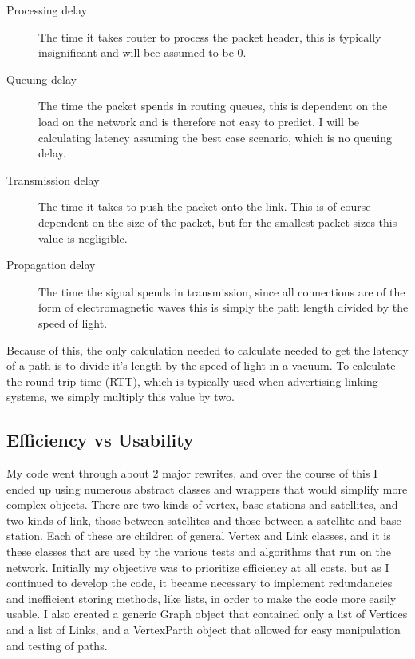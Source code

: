\documentclass[12pt]{report}
\begin{document}
\begin{description}
\item[Processing delay] The time it takes router to process the packet header, this is typically insignificant and will bee assumed to be 0.
\item[Queuing delay]  The time the packet spends in routing queues, this is dependent on the load on the network and is therefore not easy to predict. I will be calculating latency assuming the best case scenario, which is no queuing delay.
\item[Transmission delay] The time it takes to push the packet onto the link. This is of course dependent on the size of the packet, but for the smallest packet sizes this value is negligible. 
\item[Propagation delay] The time the signal spends in transmission, since all connections are of the form of electromagnetic waves this is simply the path length divided by the speed of light.
\end{description}

Because of this, the only calculation needed to calculate needed to get the latency of a path is to divide it's length by the speed of light in a vacuum. To calculate the round trip time (RTT), which is typically used when advertising linking systems, we simply multiply this value by two.

\subsection{Efficiency vs Usability}
My code went through about 2 major rewrites, and over the course of this I ended up using numerous abstract classes and wrappers that would simplify more complex objects. There are two kinds of vertex, base stations and satellites, and two kinds of link, those between satellites and those between a satellite and base station. Each of these are children of general Vertex and Link classes, and it is these classes that are used by the various tests and algorithms that run on the network. Initially my objective was to prioritize efficiency at all costs, but as I continued to develop the code, it became necessary to implement redundancies and inefficient storing methods, like lists, in order to make the code more easily usable. I also created a generic Graph object that contained only a list of Vertices and a list of Links, and a VertexParth object that allowed for easy manipulation and testing of paths.
\end{document}
